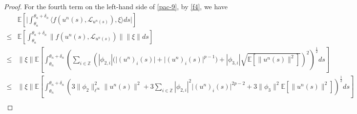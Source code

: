 \documentclass[11pt]{article}
\numberwithin{equation}{section}
\theoremstyle{plain}
\begin{document}
\begin{proof}
 For the fourth term on the left-hand side of \eqref{pac-9}, 
 by \eqref{f4}, we have
 \begin{align} \label{pac-14}
       & \mathbb{E}
                  \left[ 
                           \Big| \int_{\theta_n}^{\theta_n + \delta_n} 
                                           \langle f(u^n(s), \mathcal{L}_{u^n(s)}), 
                                                        \xi 
                                           \rangle ds 
                            \Big|
                  \right]  \nonumber \\
  \le & \mathbb{E}
                   \left[ \int_{\theta_n}^{\theta_n + \delta_n} 
                                           \| f(u^n(s), \mathcal{L}_{u^n(s)}) \|
                                           \| \xi \| 
                              ds 
                    \right]  \nonumber \\   
  \le & \| \xi \| 
           \mathbb{E}
                  \left[ 
                           \int_{\theta_n}^{\theta_n + \delta_n} 
                                \left( \sum_{i \in \mathbb{Z} }
                                               \left( | \phi_{2,i} | 
                                                          \big( \big| (u^n)_i(s) \big| 
                                                                   + \big| (u^n)_i(s) \big|^{p-1} 
                                                          \big) 
                                                         + | \phi_{3,i} | 
                                                             \sqrt{\mathbb{E} \left[ \| u^n(s) \|^2\right] } 
                                                \right)^2
                                \right)^{\frac{1}{2} }                                     
                            ds 
                  \right]  \nonumber \\ 
  \le & \| \xi \| 
           \mathbb{E}
                  \left[ \int_{\theta_n}^{\theta_n + \delta_n} 
                               \left( 3 \| \phi_2 \|_{\ell^\infty}^2 \| u^n(s) \|^2 
                                        + 3 \sum_{i \in \mathbb{Z} } 
                                                     | \phi_{2,i} |^{2}
                                                     \big| (u^n)_i(s) \big|^{2p-2} 
                                        + 3 \|\phi_{3}\|^2 
                                           \mathbb{E} \left[ \| u^n(s) \|^2\right]                                     
                                \right)^{\frac{1}{2} } ds 
                  \right]  \nonumber \\  

\end{align}
\end{proof}
\end{document}

